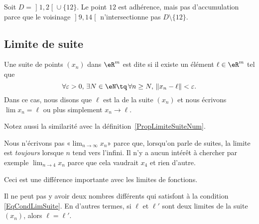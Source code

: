 \begin{example}     \label{EXooWOYQooJolaTV}
	Soit \( D=\mathopen] 1 , 2 \mathclose[\cup\{ 12 \}\). Le point \( 12\) est adhérence, mais pas d'accumulation parce que le voisinage \( \mathopen] 9 , 14 \mathclose[\) n'intersectionne pas \( D\setminus \{ 12 \}\).
\end{example}

\subsection{Limite de suite}

\begin{definition}
	Une suite de points \( (x_n)\) dans \( \eR^m\) est dite  si il existe un élément \( \ell\in\eR^m\) tel que
	\begin{equation}	\label{EqCondLimSuite}
		\forall\varepsilon>0,\,\exists N\in \eN\tq\,\forall n\geq N,\,\| x_n-\ell \|<\varepsilon.
	\end{equation}
	Dans ce cas, nous disons que \( \ell\) est la  de la suite \( (x_n)\) et nous écrivons \( \lim x_n=\ell\) ou plus simplement \( x_n\to \ell\).
\end{definition}
Notez aussi la similarité avec la définition~\ref{PropLimiteSuiteNum}.

\begin{remark}
	Nous n'écrivons pas «\( \lim_{n\to\infty}x_n\)» parce que, lorsqu'on parle de suites, la limite est \emph{toujours} lorsque \( n\) tend vers l'infini. Il n'y a aucun intérêt à chercher par exemple \( \lim_{n\to 4}x_n\) parce que cela vaudrait \( x_4\) et rien d'autre.

	Ceci est une différence importante avec les limites de fonctions.
\end{remark}

\begin{lemma}
	Il ne peut pas y avoir deux nombres différents qui satisfont à la condition \eqref{EqCondLimSuite}. En d'autres termes, si \( \ell\) et \( \ell'\) sont deux limites de la suite \( (x_n)\), alors \( \ell=\ell'\).
\end{lemma}

